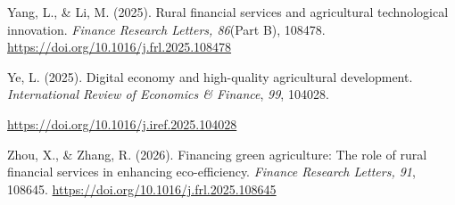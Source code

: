 \documentclass[
]{article}
\begin{document}
Yang, L., \& Li, M. (2025). Rural financial services and agricultural
technological innovation. \emph{Finance Research Letters, 86}(Part B),
108478. \url{https://doi.org/10.1016/j.frl.2025.108478}

Ye, L. (2025). Digital economy and high-quality agricultural
development. \emph{International Review of Economics \& Finance},
\emph{99}, 104028.

\url{https://doi.org/10.1016/j.iref.2025.104028}

Zhou, X., \& Zhang, R. (2026). Financing green agriculture: The role of
rural financial services in enhancing eco-efficiency. \emph{Finance
Research Letters, 91}, 108645.
\url{https://doi.org/10.1016/j.frl.2025.108645}
\end{document}
